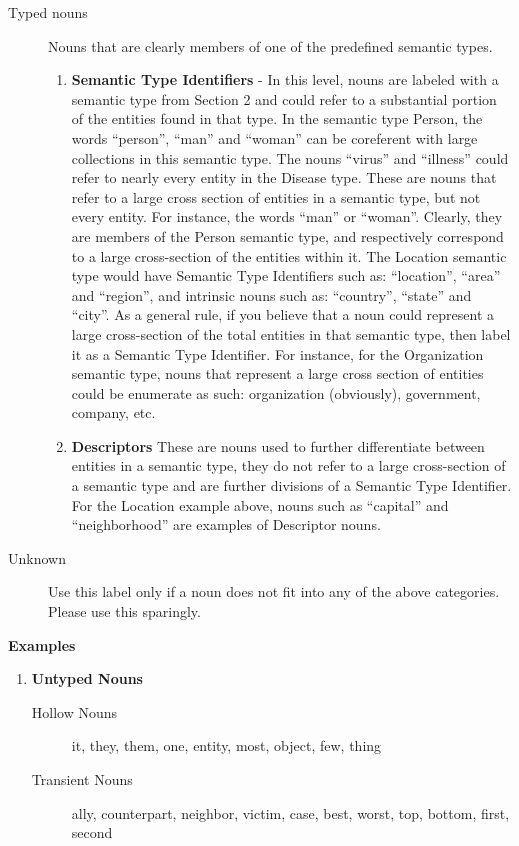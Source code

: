 \documentclass[letterpaper,12pt]{article}
\begin{document}
\begin{enumerate}
\begin{description}
			\item[Typed nouns] Nouns that are clearly members of one of the predefined semantic types. 
			  \begin{enumerate}
				 \item \textbf{Semantic Type Identifiers} - In this level, nouns are labeled with a semantic type from Section 2 and could refer to a substantial portion of the entities found in that type.  In the semantic type {\sc Person}, the words ``person'', ``man'' and ``woman'' can be coreferent with large collections in this semantic type. The nouns ``virus'' and ``illness'' could refer to nearly every entity in the {\sc Disease} type.  These are nouns that refer to a large cross section of entities in a semantic type, but not every entity. For instance, the words ``man'' or ``woman''. Clearly, they are members of the {\sc Person} semantic type, and respectively correspond to a large cross-section of the entities within it. 
					 The {\sc Location} semantic type would have Semantic Type Identifiers such as: ``location'', ``area'' and ``region'', and intrinsic nouns such as: ``country'', ``state'' and ``city''. As a general rule, if you believe that a noun could represent a large cross-section of the total entities in that semantic type, then label it as a Semantic Type Identifier. For instance, for the {\sc Organization} semantic type, nouns that represent a large cross section of entities could be enumerate as such: organization (obviously), government, company, etc.
				 
				 \item \textbf{Descriptors} These are nouns used to further differentiate between entities in a semantic type, they do not refer to a large cross-section of a semantic type and are further divisions of a Semantic Type Identifier. For the {\sc Location} example above, nouns such as ``capital'' and ``neighborhood'' are examples of Descriptor nouns.
			  \end{enumerate}

			\item[Unknown] Use this label only if a noun does not fit into any of the above categories. Please use this sparingly.
		\end{description}
	
\newpage
\begin{center}
\textbf{Examples}\\
\end{center}

\begin{enumerate}
  \item \textbf{Untyped Nouns} \\
	  \begin{description}
			\item[Hollow Nouns] it, they, them, one, entity, most, object, few, thing
			\item[Transient Nouns] ally, counterpart, neighbor, victim, case, best, worst, top, bottom, first, second
	  \end{description}


\end{enumerate}
\end{enumerate}
\end{document}
